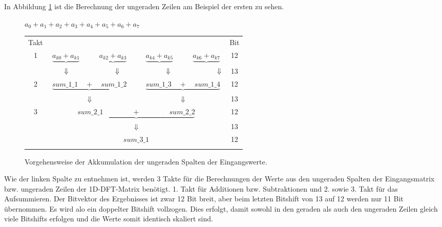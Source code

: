In Abbildung \ref{pic:AkkumulationUngeradeSpalten} ist die Berechnung der ungeraden Zeilen am Beispiel der ersten zu sehen.

\begin{figure}[htbp]
\centering
$a_{0} + a_{1} + a_{2} + a_{3} + a_{4} + a_{5} + a_{6} + a_{7}$\\

\vspace{0.5cm}
\begin{tabular}{ccccccccc}
Takt&\multicolumn{6}{l}{ } & & Bit\\
1&$\underbrace{a_{k0} + a_{k1}}$ &  &$ \underbrace{a_{k2} + a_{k3}}$ &  &$\underbrace{a_{k4} + a_{k5}}$ &  &$\underbrace{a_{k6} + a_{k7}}$ & 12\\
&\multicolumn{7}{l}{$\hspace{0.65cm} \Downarrow \hspace{2.3cm} \Downarrow \hspace{2.3cm} \Downarrow \hspace{2.3cm}\Downarrow$}&13\\
2&\multicolumn{3}{c}{$\underbrace{sum\_1\_1 \quad + \quad sum\_1\_2}$} & & \multicolumn{3}{c}{$\underbrace{sum\_1\_3 \quad + \quad sum\_1\_4}$} & 12\\
&\multicolumn{3}{c}{$\Downarrow$} & & \multicolumn{3}{c}{$\Downarrow$}&13\\
3&\multicolumn{7}{c}{$\underbrace{sum\_2\_1 \quad  \quad \quad \quad + \quad \quad \quad  \quad sum\_2\_2}$} & 12\\
&\multicolumn{7}{c}{$\Downarrow$}&13\\
&\multicolumn{7}{c}{$sum\_3\_1$} & 12\\
&\end{tabular}
\caption{Vorgehensweise der Akkumulation der ungeraden Spalten der Eingangswerte.}
\label{pic:AkkumulationUngeradeSpalten}
\end{figure}

\vspace{0.5cm}

Wie der linken Spalte zu entnehmen ist, werden 3 Takte für die Berechnungen der Werte aus den ungeraden Spalten der Eingangsmatrix bzw. ungeraden Zeilen der 1D-DFT-Matrix benötigt.
1. Takt für Additionen bzw. Subtraktionen und 2. sowie 3. Takt für das Aufsummieren. Der Bitvektor des Ergebnisses ist zwar 12 Bit breit, aber beim letzten Bitshift von 13 auf 12
werden nur 11 Bit übernommen. Es wird alo ein doppelter Bitshift vollzogen. Dies erfolgt, damit sowohl in den geraden als auch den ungeraden Zeilen gleich viele Bitshifts erfolgen
und die Werte somit identisch skaliert sind.

